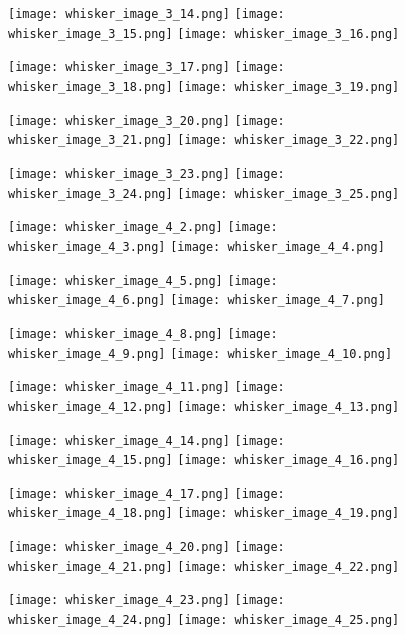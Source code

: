 \documentclass[12pt]{article}
\begin{document}
\begin{figure}
	\centerline{
		\texttt{[image: whisker\_image\_3\_14.png]}
		\texttt{[image: whisker\_image\_3\_15.png]}
		\texttt{[image: whisker\_image\_3\_16.png]}
	}
	\centerline{
		\texttt{[image: whisker\_image\_3\_17.png]}
		\texttt{[image: whisker\_image\_3\_18.png]}
		\texttt{[image: whisker\_image\_3\_19.png]}
	}
	\centerline{
		\texttt{[image: whisker\_image\_3\_20.png]}
		\texttt{[image: whisker\_image\_3\_21.png]}
		\texttt{[image: whisker\_image\_3\_22.png]}
	}
	\centerline{
		\texttt{[image: whisker\_image\_3\_23.png]}
		\texttt{[image: whisker\_image\_3\_24.png]}
		\texttt{[image: whisker\_image\_3\_25.png]}
	}
\end{figure}

\begin{figure}
	\centerline{
		\texttt{[image: whisker\_image\_4\_2.png]}
		\texttt{[image: whisker\_image\_4\_3.png]}
		\texttt{[image: whisker\_image\_4\_4.png]}
	}
	\centerline{
		\texttt{[image: whisker\_image\_4\_5.png]}
		\texttt{[image: whisker\_image\_4\_6.png]}
		\texttt{[image: whisker\_image\_4\_7.png]}
	}
	\centerline{
		\texttt{[image: whisker\_image\_4\_8.png]}
		\texttt{[image: whisker\_image\_4\_9.png]}
		\texttt{[image: whisker\_image\_4\_10.png]}
	}
	\centerline{
		\texttt{[image: whisker\_image\_4\_11.png]}
		\texttt{[image: whisker\_image\_4\_12.png]}
		\texttt{[image: whisker\_image\_4\_13.png]}
	}
\end{figure}

\begin{figure}
	\centerline{
		\texttt{[image: whisker\_image\_4\_14.png]}
		\texttt{[image: whisker\_image\_4\_15.png]}
		\texttt{[image: whisker\_image\_4\_16.png]}
	}
	\centerline{
		\texttt{[image: whisker\_image\_4\_17.png]}
		\texttt{[image: whisker\_image\_4\_18.png]}
		\texttt{[image: whisker\_image\_4\_19.png]}
	}
	\centerline{
		\texttt{[image: whisker\_image\_4\_20.png]}
		\texttt{[image: whisker\_image\_4\_21.png]}
		\texttt{[image: whisker\_image\_4\_22.png]}
	}
	\centerline{
		\texttt{[image: whisker\_image\_4\_23.png]}
		\texttt{[image: whisker\_image\_4\_24.png]}
		\texttt{[image: whisker\_image\_4\_25.png]}
	}
\end{figure}
\end{document}
